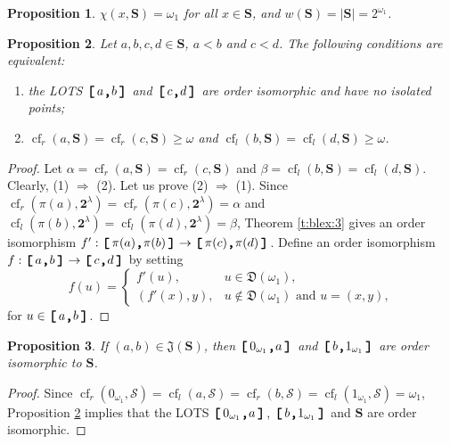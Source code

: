\documentclass[preprint]{elsarticle}
\def\om{\omega}
\def\be{\beta}
\def\al{\alpha}
\def\la{\lambda}
\def\cS{{\mathcal S}}
\newtheorem{proposition}{Proposition}[section]
\theoremstyle{definition}
\theoremstyle{remark}
\def\rarr{\Rightarrow}
\def\cf{\operatorname{cf}}
\def\lex#1#2{\mathfrak{L}(#2^{#1})}
\def\lex#1#2{#2^{#1}}
\def\homm#1{{\mathfrak{D}(#1)}}
\def\B{2}
\def\B{\mathsf{2}}
\def\B{\mathbf{2}}
\def\ilcomma/{\boldsymbol{,}}
\def\ilsymlc{\boldsymbol{[}}
\def\ilsymrc{\boldsymbol{]}}
\def\ilfont#1{\boldsymbol{#1}}
\def\ilfontX#1{\mathrm{\text{\texttt{\textbf{\large #1}}}}}
\def\ilfontX#1{{\text{\texttt{\textbf{\large \upshape #1}}}}}
\def\ilfont#1{\raisebox{-1.2pt}{\ilfontX{#1}}}
\def\ilfontC#1{\raisebox{-0.7pt}{\ilfontX{#1}}}
\def\ilcomma/{\ilfontC{,}}
\def\ilsymlc{\ilfont{[}\,}
\def\ilsymrc{\,\ilfont{]}}
\def\ilcc[#1,#2]{\ilsymlc#1\ilcomma/ #2\ilsymrc}
\def\jumps#1{\mathfrak{J}(#1)}
\def\lexab{\lex\la\B}
\def\sS{\mathbf{S}}
\def\mns{0_{\om_1}}
\def\mxs{1_{\om_1}}
\begin{document}
\begin{proposition}\label{p:bsc:1-1}
$\chi(x,\sS)=\om_1$ for all $x\in \sS$, and $w(\sS)=|\sS|=2^{\om_1}$.
\end{proposition}


\begin{proposition}\label{p:bsc:1}
Let $a,b,c,d\in \sS$, $a<b$ and $c<d$.
The following conditions are equivalent:
\begin{enumerate}
\item
the LOTS $\ilcc[a,b]$ and $\ilcc[c,d]$ are order isomorphic and have no isolated points;
\item
$\cf_r(a,\sS)=\cf_r(c,\sS)\geq \om$ and
$\cf_l(b,\sS)=\cf_l(d,\sS)\geq \om$.
\end{enumerate}
\end{proposition}
\begin{proof}
Let
$\al=\cf_r(a,\sS)=\cf_r(c,\sS)$ and
$\be = \cf_l(b,\sS)=\cf_l(d,\sS)$.
Clearly, (1) $\rarr$ (2). Let us prove (2) $\rarr$ (1). Since $\cf_r(\pi(a),\lexab)=\cf_r(\pi(c),\lexab)=\al$ and
$\cf_l(\pi(b),\lexab)=\cf_l(\pi(d),\lexab)=\be$, Theorem \ref{t:blex:3} gives an order isomorphism $f': \ilcc[\pi(a),\pi(b)]\to \ilcc[\pi(c),\pi(d)]$. Define an order isomorphism $f: \ilcc[a,b]\to\ilcc[c,d]$ by setting
\[
f(u)=\begin{cases}
f'(u), & u\in \homm{\om_1},
\\
(f'(x),y), & u\notin \homm{\om_1}\text{ and }u=(x,y),
\end{cases}
\]
for $u\in \ilcc[a,b]$.
\end{proof}

\begin{proposition}\label{p:bsc:1+1}
If $(a,b)\in \jumps\sS$, then $\ilcc[\mns,a]$ and $\ilcc[b,\mxs]$ are order isomorphic to $\sS$.
\end{proposition}
\begin{proof}
Since $\cf_r(\mns,\cS)=\cf_l(a,\cS)=\cf_r(b,\cS)=\cf_l(\mxs,\cS)=\om_1$, Proposition \ref{p:bsc:1} implies that the LOTS $\ilcc[\mns,a]$, $\ilcc[b,\mxs]$ and $\sS$ are order isomorphic.
\end{proof}
\end{document}
